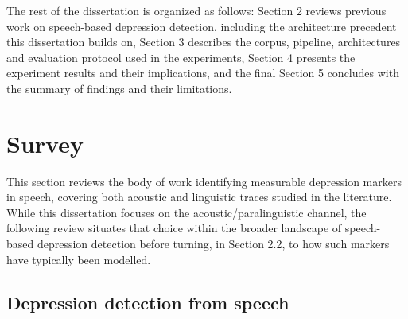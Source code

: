 \documentclass{mproj}
\begin{document}
The rest of the dissertation is organized as follows: Section 2 reviews previous work on speech-based depression detection, including the architecture precedent this dissertation builds on, Section 3 describes the corpus, pipeline, architectures and evaluation protocol used in the experiments, Section 4 presents the experiment results and their implications, and the final Section 5 concludes with the summary of findings and their limitations.

\chapter{Survey}\label{survey}

This section reviews the body of work identifying measurable depression markers in speech, covering both acoustic and linguistic traces studied in the literature. While this dissertation focuses on the acoustic/paralinguistic channel, the following review situates that choice within the broader landscape of speech-based depression detection before turning, in Section 2.2, to how such markers have typically been modelled.

\section{Depression detection from speech}\label{sec:markers}
\end{document}
